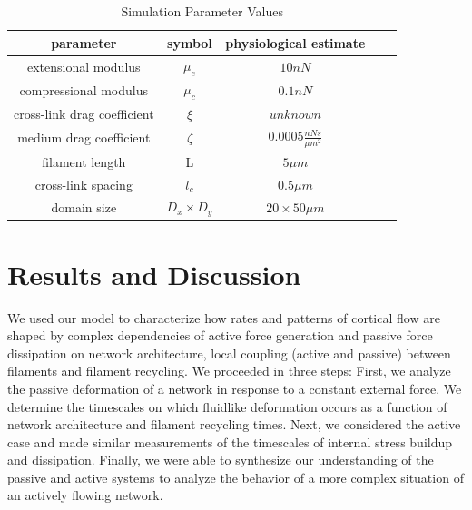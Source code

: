 \documentclass[10pt,letterpaper]{article}
\begin{document}
\begin{table}[h]
\centering
\caption{Simulation Parameter Values}
\label{table:para}
\begin{tabular}{|c|c|c|c|c|}
\hline
{\bf parameter}             & {\bf symbol} & {\bf physiological estimate}          \\ \hline
extensional modulus         & $\mu_e$        & $10 nN $                                               \\
compressional modulus             & $\mu_c$     & $ 0.1 nN $                           \\
cross-link drag coefficient & $\xi$      & $unknown $              \\
medium drag coefficient     & $\zeta$        & $0.0005 \frac{nN s}{\mu m^2} $      \\
filament length             & L            & $5 \mu m$                                          \\
cross-link spacing          & $l_c$        & $0.5 \mu m$                                         \\
domain size                 & $D_x\times D_y$            & $20\times 50 \mu m$                                 \\ \hline
\end{tabular}
\end{table}



\section*{Results and Discussion}
We used our model to characterize how rates and patterns of cortical flow are shaped by complex dependencies of active force generation and passive force dissipation on network architecture, local coupling (active and passive) between filaments and filament recycling.  We proceeded in three steps:  First, we analyze the passive deformation of a network in response to a constant external force.  We determine the timescales on which fluidlike deformation occurs as a function of network architecture and filament recycling times.  Next, we considered the active case and made similar measurements of the timescales of internal stress buildup and dissipation. Finally, we were able to synthesize our understanding of the passive and active systems to analyze the behavior of a more complex situation of an actively flowing network.


\end{document}
